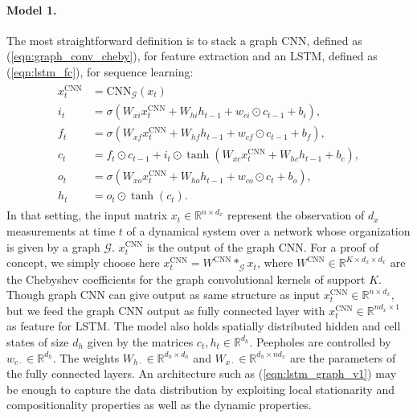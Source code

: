 \documentclass{article}
\newcommand{\R}{\mathbb{R}}
\newcommand{\G}{\mathcal{G}}
\newcommand{\eqnref}[1]{(\ref{eqn:#1})}
\begin{document}
\paragraph{Model 1.} The most straightforward definition is to stack a graph
CNN, defined as \eqnref{graph_conv_cheby}, for feature extraction and an LSTM,
defined as \eqnref{lstm_fc}, for sequence learning:
\begin{align} \label{eqn:lstm_graph_v1}
\begin{split}
x_t^{\textrm{CNN}} &=  \textrm{CNN}_\G(x_t)\\
i_t &= \sigma(W_{xi} x_t^{\textrm{CNN}} + W_{hi} h_{t-1}  +
w_{ci} \odot c_{t-1} + b_i), \\
f_t &= \sigma(W_{xf} x_t^{\textrm{CNN}} + W_{hf} h_{t-1} + w_{cf} \odot c_{t-1} + b_f), \\
c_t &= f_t \odot c_{t-1} + i_t \odot \tanh(W_{xc} x_t^{\textrm{CNN}} + W_{hc} h_{t-1} + b_c), \\
o_t &= \sigma(W_{xo} x_t^{\textrm{CNN}} + W_{ho} h_{t-1} + w_{co} \odot c_t + b_o), \\
h_t &= o_t \odot \tanh(c_t).
\end{split}
\end{align}
In that setting, the input matrix $x_t \in \R^{n \times d_x}$ represent the
observation of $d_x$ measurements at time $t$ of a dynamical system over a
network whose organization is given by a graph $\G$. $x_t^{\textrm{CNN}} $ is the output of the graph CNN. For a proof of concept, we simply choose here $x_t^{\textrm{CNN}} = W^{\textrm{CNN}} \ast_\G x_t$, where $W^{\textrm{CNN}} \in \R^{K \times d_x \times d_x}$ are the Chebyshev coefficients  for the graph convolutional kernels of support $K$. Though graph CNN can give output as same structure as input $x_t^{\textrm{CNN}} \in \R^{n \times d_x}$, but we feed the graph CNN output as fully connected layer with $x_t^{\textrm{CNN}} \in \R^{nd_x \times 1}$ as feature for LSTM. The model also holds spatially distributed hidden and cell states of size $d_h$ given by the matrices $c_t, h_t \in \R^{d_h}$. Peepholes are controlled by $w_{c\cdot} \in \R^{d_h}$. The weights $W_{h\cdot} \in
\R^{ d_h \times d_h}$ and $W_{x\cdot} \in \R^{d_h \times nd_x}$ are the parameters of the fully connected layers. An architecture such as \eqnref{lstm_graph_v1} may be enough to capture the data distribution by exploiting local stationarity and compositionality properties as well as the dynamic properties.
\end{document}
